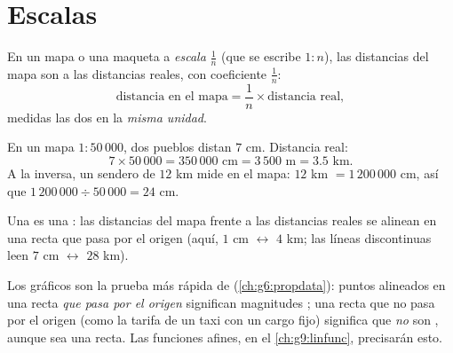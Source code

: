\section{Escalas}

\begin{definition}[Escala]\label{def:g7:prop:scale}
En un mapa o una maqueta a \emph{escala}
$\frac{1}{n}$ (que se escribe $1 : n$), las distancias del mapa son
 a las distancias reales, con coeficiente $\frac1n$:
\[
\text{distancia en el mapa} = \frac{1}{n} \times \text{distancia real},
\]
medidas las dos en la \emph{misma unidad}.
\end{definition}

\begin{example}\label{ex:g7:prop:scale}
En un mapa $1 : 50\,000$, dos pueblos distan $7$ cm. Distancia real:
\[
7 \times 50\,000 = 350\,000 \text{ cm} = 3\,500 \text{ m} = 3.5
\text{ km}.
\]
A la inversa, un sendero de $12$ km mide en el mapa:
$12$ km $= 1\,200\,000$ cm, así que $1\,200\,000 \div 50\,000 = 24$ cm.
\end{example}

\begin{omfigure}

{\small Una  es una : las distancias del mapa frente a las
distancias reales se alinean en una recta que pasa por el origen (aquí,
$1$ cm $\leftrightarrow$ $4$ km; las líneas discontinuas leen $7$ cm
$\leftrightarrow$ $28$ km).}
\end{omfigure}

\begin{remark}
Los gráficos son la prueba más rápida de 
(\cref{ch:g6:propdata}): puntos alineados en una recta \emph{que pasa por el
origen} significan magnitudes ; una recta que no pasa por el origen (como
la tarifa de un taxi con un cargo fijo) significa que \emph{no} son , aunque
sea una recta. Las funciones afines, en el
\cref{ch:g9:linfunc}, precisarán esto.
\end{remark}

